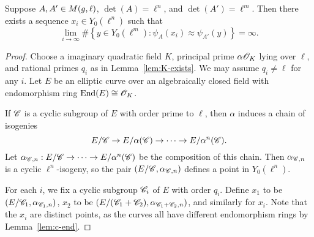 \documentclass{amsart}
\begin{document}
\begin{lemma}\label{lem:lim-degree}
  Suppose $A,A' \in M(g,\ell)$, $\det(A) = \ell^n$, and $\det(A') = \ell^m$.
  Then there exists a sequence $x_i \in Y_0(\ell^n)$ such that
  \[
    \lim_{i \to \infty}\#\left\{ y \in Y_0(\ell^m) \colon \psi_A(x_i) \approx \psi_{A'}(y) \right\} = \infty.
  \]
\end{lemma}
\begin{proof}
  Choose a imaginary quadratic field $K$, principal prime $\alpha\mathscr{O}_K$ lying over $\ell$, and rational primes $q_i$ as in Lemma~\ref{lem:K-exists}. We may assume $q_i \neq \ell$ for any $i$. Let $E$ be an elliptic curve over an algebraically closed field with endomorphism ring $\operatorname{End}(E) \cong \mathscr{O}_K$.

  If $\mathscr{C}$ is a cyclic subgroup of $E$ with order prime to $\ell$, then $\alpha$ induces a chain of isogenies
  \[
    E/\mathscr{C} \to E/\alpha(\mathscr{C}) \to \cdots \to E/\alpha^n(\mathscr{C}).
  \]
  Let $\alpha_{\mathscr{C},n}: E/\mathscr{C} \to \cdots \to E/\alpha^n(\mathscr{C})$ be the composition of this chain. Then $\alpha_{\mathscr{C},n}$ is a cyclic $\ell^n$-isogeny, so the pair $(E/\mathscr{C},\alpha_{\mathscr{C},n})$ defines a point in $Y_0(\ell^n)$.

    For each $i$, we fix a cyclic subgroup $\mathscr{C}_i$ of $E$ with order $q_i$. Define $x_1$ to be $(E/\mathscr{C}_1,\alpha_{\mathscr{C}_1,n})$, $x_2$ to be $(E/(\mathscr{C}_1 + \mathscr{C}_2), \alpha_{\mathscr{C}_1 + \mathscr{C}_2,n})$, and similarly for $x_i$. Note that the $x_i$ are distinct points, as the curves all have different endomorphism rings by Lemma~\ref{lem:c-end}.


\end{proof}
\end{document}
